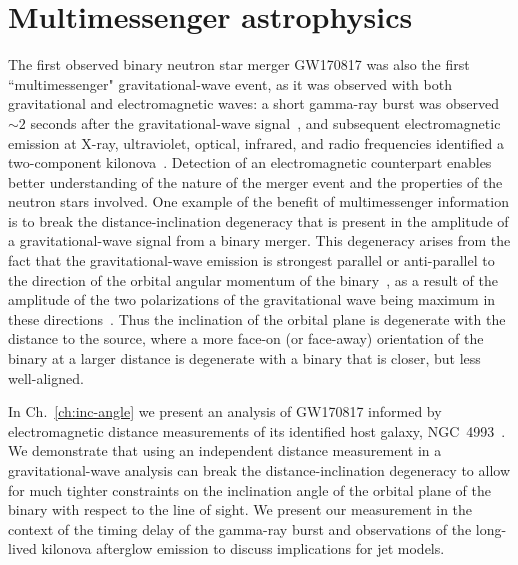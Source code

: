\section{Multimessenger astrophysics}
The first observed binary neutron star merger GW170817 was also the first ``multimessenger" gravitational-wave event, as it was observed with both gravitational and electromagnetic waves: a short gamma-ray burst was observed $\sim 2$ seconds after the gravitational-wave signal~\cite{Goldstein:2017mmi,Savchenko:2017ffs}, and subsequent electromagnetic emission at X-ray, ultraviolet, optical, infrared, and radio frequencies identified a two-component kilonova~\cite{Chornock:2017sdf,Cowperthwaite:2017dyu,Kasliwal:2017ngb,Nicholl:2017ahq,Pian:2017gtc,Smartt:2017fuw,Villar:2017wcc}. Detection of an electromagnetic counterpart enables better understanding of the nature of the merger event and the properties of the neutron stars involved. One example of the benefit of multimessenger information is to break the distance-inclination degeneracy that is present in the amplitude of a gravitational-wave signal from a binary merger. This degeneracy arises from the fact that the gravitational-wave emission is strongest parallel or anti-parallel to the direction of the orbital angular momentum of the binary~\cite{Wahlquist:1987rx}, as a result of the amplitude of the two polarizations of the gravitational wave being maximum in these directions~\cite{Usman:2018imj}. Thus the inclination of the orbital plane is degenerate with the distance to the source, where a more face-on (or face-away) orientation of the binary at a larger distance is degenerate with a binary that is closer, but less well-aligned.

In Ch.~\ref{ch:inc-angle} we present an analysis of GW170817 informed by electromagnetic distance measurements of its identified host galaxy, NGC~4993~\cite{Soares-Santos:2017lru}. We demonstrate that using an independent distance measurement in a gravitational-wave analysis can break the distance-inclination degeneracy to allow for much tighter constraints on the inclination angle of the orbital plane of the binary with respect to the line of sight. We present our measurement in the context of the timing delay of the gamma-ray burst and observations of the long-lived kilonova afterglow emission to discuss implications for jet models.

